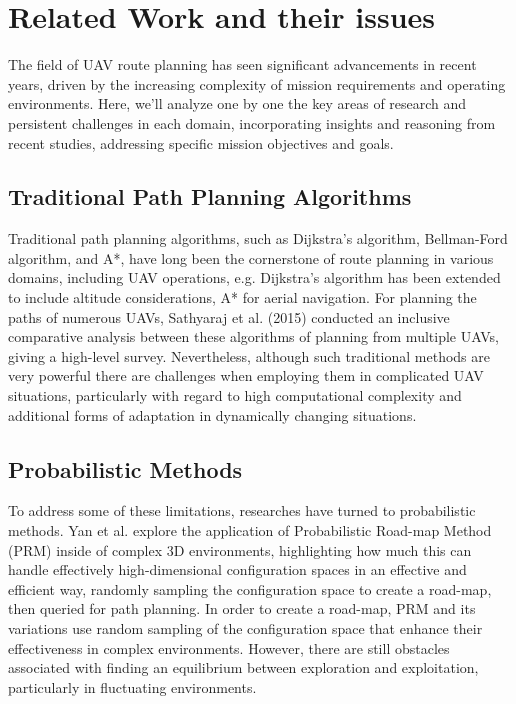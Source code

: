 \documentclass[conference]{IEEEtran}
\begin{document}
\section{Related Work and their issues}

The field of UAV route planning has seen significant advancements in recent years, driven by the increasing complexity of mission requirements and operating environments. Here, we'll analyze one by one the key areas of research and persistent challenges in each domain, incorporating insights and reasoning from recent studies, addressing specific mission objectives and goals.

\subsection{Traditional Path Planning Algorithms}

Traditional path planning algorithms, such as Dijkstra's algorithm, Bellman-Ford algorithm, and A*, have long been the cornerstone of route planning in various domains, including UAV operations, e.g. Dijkstra's algorithm has been extended to include altitude considerations, A* for aerial navigation. For planning the paths of numerous UAVs, Sathyaraj et al. (2015) \cite{paper1} conducted an inclusive comparative analysis between these algorithms of planning from multiple UAVs, giving a high-level survey. Nevertheless, although such traditional methods are very powerful there are challenges when employing them in complicated UAV situations, particularly with regard to high computational complexity and additional forms of adaptation in dynamically changing situations. 

\subsection{Probabilistic Methods}

To address some of these limitations, researches have turned to probabilistic methods. Yan et al. \cite{paper3} explore the application of Probabilistic Road-map Method (PRM) inside of complex 3D environments, highlighting how much this can handle effectively high-dimensional configuration spaces in an effective and efficient way, randomly sampling the configuration space to create a road-map, then queried for path planning. In order to create a road-map, PRM and its variations use random sampling of the configuration space that enhance their effectiveness in complex environments. However, there are still obstacles associated with finding an equilibrium between exploration and exploitation, particularly in fluctuating environments.
\end{document}
